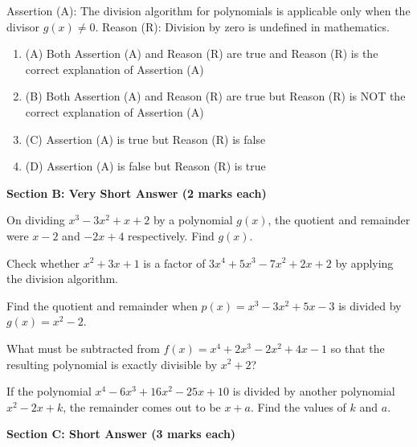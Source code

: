 \documentclass[12pt,a4paper]{exam}
\begin{document}
\begin{questions}
\question[1] Assertion (A): The division algorithm for polynomials is applicable only when the divisor $g(x) \neq 0$. Reason (R): Division by zero is undefined in mathematics.
\begin{enumerate}[label=(\Alph*)]
  \item (A) Both Assertion (A) and Reason (R) are true and Reason (R) is the correct explanation of Assertion (A)
  \item (B) Both Assertion (A) and Reason (R) are true but Reason (R) is NOT the correct explanation of Assertion (A)
  \item (C) Assertion (A) is true but Reason (R) is false
  \item (D) Assertion (A) is false but Reason (R) is true
\end{enumerate}
\vspace{0.15cm}

\end{questions}
\bigskip
\noindent\textbf{\large Section B: Very Short Answer (2 marks each)}

\begin{questions}
\question[2] On dividing $x^3 - 3x^2 + x + 2$ by a polynomial $g(x)$, the quotient and remainder were $x - 2$ and $-2x + 4$ respectively. Find $g(x)$.
\vspace{0.15cm}

\question[2] Check whether $x^2 + 3x + 1$ is a factor of $3x^4 + 5x^3 - 7x^2 + 2x + 2$ by applying the division algorithm.
\vspace{0.15cm}

\question[2] Find the quotient and remainder when $p(x) = x^3 - 3x^2 + 5x - 3$ is divided by $g(x) = x^2 - 2$.
\vspace{0.15cm}

\question[2] What must be subtracted from $f(x) = x^4 + 2x^3 - 2x^2 + 4x - 1$ so that the resulting polynomial is exactly divisible by $x^2 + 2$?
\vspace{0.15cm}

\question[2] If the polynomial $x^4 - 6x^3 + 16x^2 - 25x + 10$ is divided by another polynomial $x^2 - 2x + k$, the remainder comes out to be $x + a$. Find the values of $k$ and $a$.
\vspace{0.15cm}

\end{questions}
\bigskip
\noindent\textbf{\large Section C: Short Answer (3 marks each)}
\end{document}
